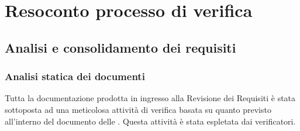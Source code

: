\section{Resoconto processo di verifica} \label{_resocontoVerifica}

\subsection{Analisi e consolidamento dei requisiti}

\subsubsection{Analisi statica dei documenti}
Tutta la documentazione prodotta in ingresso alla Revisione dei Requisiti è stata sottoposta ad una meticolosa attività di verifica
basata su quanto previsto all'interno del documento delle .
Questa attività è stata espletata dai verificatori.


